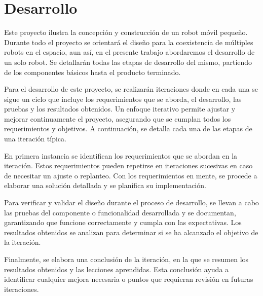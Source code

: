 \newpage
\chapter{Desarrollo}

Este proyecto ilustra la concepción y construcción de un robot móvil pequeño. Durante todo el proyecto se orientará el diseño para la coexistencia de múltiples robots en el espacio, aun así, en el presente trabajo abordaremos el desarrollo de un solo robot.  Se detallarán todas las etapas de desarrollo del mismo, partiendo de los componentes básicos hasta el producto terminado.

Para el desarrollo de este proyecto, se realizarán iteraciones donde en cada una se sigue un ciclo que incluye los requerimientos que se aborda, el desarrollo, las pruebas y los resultados obtenidos. Un enfoque iterativo permite ajustar y mejorar continuamente el proyecto, asegurando que se cumplan todos los requerimientos y objetivos. A continuación, se detalla cada una de las etapas de una iteración típica.

En primera instancia se identifican los requerimientos que se abordan en la iteración. Estos requerimientos pueden repetirse en iteraciones sucesivas en caso de necesitar un ajuste o replanteo. Con los requerimientos en mente, se procede a elaborar una solución detallada y se planifica su implementación.

Para verificar y validar el diseño durante el proceso de desarrollo, se llevan a cabo las pruebas del componente o funcionalidad desarrollada y se documentan, garantizando que funcione correctamente y cumpla con las expectativas. Los resultados obtenidos se analizan para determinar si se ha alcanzado el objetivo de la iteración.

Finalmente, se elabora una conclusión de la iteración, en la que se resumen los resultados obtenidos y las lecciones aprendidas. Esta conclusión ayuda a identificar cualquier mejora necesaria o puntos que requieran revisión en futuras iteraciones.














